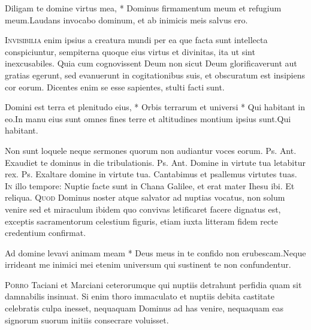 \begin{multicols*}{2}
\begin{responsory}
{Diligam te domine virtus mea, * Dominus firmamentum meum et refugium meum.}{Laudans invocabo dominum, et ab inimicis meis salvus ero.}
\end{responsory}
\lettrine[lines=2]{\zallmancaps \color{Blue} I}{nvisibilia} enim ipsius a creatura mundi per ea que facta sunt intellecta conspiciuntur, sempiterna quoque eius virtus et divinitas, ita ut sint inexcusabiles. Quia cum cognovissent Deum non sicut Deum glorificaverunt aut gratias egerunt, sed evanuerunt in cogitationibus suis, et obscuratum est insipiens cor eorum. Dicentes enim se esse sapientes, stulti facti sunt.
\begin{responsory-final}
{Domini est terra et plenitudo eius, * Orbis terrarum et universi * Qui habitant in eo.}{In manu eius sunt omnes fines terre et altitudines montium ipsius sunt.}{Qui habitant.}
\end{responsory-final}
 Non sunt loquele neque sermones quorum non audiantur voces eorum. {\color{Red} Ps.}  {\color{Red} Ant.} Exaudiet te dominus in die tribulationis. {\color{Red} Ps.}  {\color{Red} Ant.} Domine in virtute tua letabitur rex. {\color{Red} Ps.}  \V Exaltare domine in virtute tua. \R Cantabimus et psallemus virtutes tuas.
\lettrine[lines=2]{\zallmancaps \color{Red} I}{n} illo tempore: Nuptie facte sunt in Chana Galilee, et erat mater Ihesu ibi. Et reliqua.
 
\lettrine[lines=2]{\zallmancaps \color{Blue} Q}{uod} Dominus noster atque salvator ad nuptias vocatus, non solum venire sed et miraculum ibidem quo convivas
letificaret facere dignatus est, exceptis sacramentorum celestium figuris, etiam iuxta litteram fidem recte credentium confirmat.
\begin{responsory}
{Ad domine levavi animam meam * Deus meus in te confido non erubescam.}{Neque irrideant me inimici mei etenim universum qui sustinent te non confundentur.}
\end{responsory}
\lettrine[lines=2]{\zallmancaps \color{Red} P}{orro} Taciani et Marciani ceterorumque qui nuptiis detrahunt perfidia quam sit damnabilis insinuat. Si enim thoro immaculato et nuptiis debita castitate celebratis culpa inesset, nequaquam Dominus ad has venire, nequaquam eas signorum suorum initiis consecrare voluisset.

\end{multicols*}
